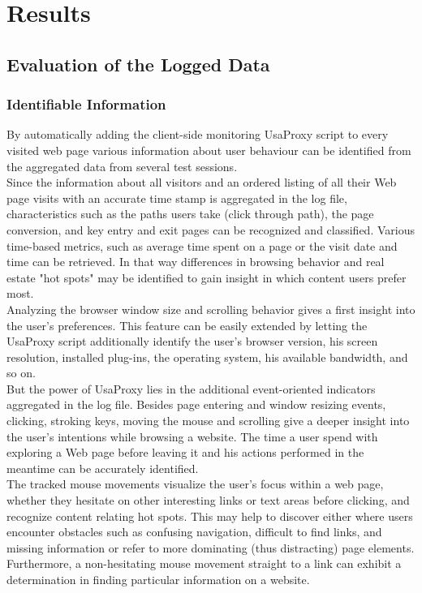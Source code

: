 \section{Results}
\label{sec:results}

\subsection{Evaluation of the Logged Data}

\subsubsection{Identifiable Information}
By automatically adding the client-side monitoring UsaProxy script to every visited web page various information about user behaviour can be identified from the aggregated data from several test sessions.\\

Since the information about all visitors and an ordered listing of all their Web page visits with an accurate time stamp is aggregated in the log file, characteristics such as the paths users take (click through path), the page conversion, and key entry and exit pages can be recognized and classified. Various time-based metrics, such as average time spent on a page or the visit date and time can be retrieved. In that way differences in browsing behavior and real estate "hot spots" may be identified to gain insight in which content users prefer most. \\

Analyzing the browser window size and scrolling behavior gives a first insight into the user's preferences. This feature can be easily extended by letting the UsaProxy script additionally identify the user's browser version, his screen resolution, installed plug-ins, the operating system, his available bandwidth, and so on.\\

But the power of UsaProxy lies in the additional event-oriented indicators aggregated in the log file. Besides page entering and window resizing events, clicking, stroking keys, moving the mouse and scrolling give a deeper insight into the user's intentions while browsing a website. The time a user spend with exploring a Web page before leaving it and his actions performed in the meantime can be accurately identified.\\

The tracked mouse movements visualize the user's focus within a web page, whether they hesitate on other interesting links or text areas before clicking, and recognize content relating hot spots.
This may help to discover either where users encounter obstacles such as confusing navigation, difficult to find links, and missing information or refer to more dominating (thus distracting) page elements. Furthermore, a non-hesitating mouse movement straight to a link can exhibit a determination in finding particular information on a website. \\

